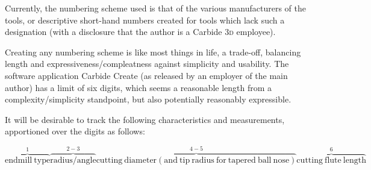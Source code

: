 \documentclass{ltxdoc}
\begin{document}
Currently, the numbering scheme used is that of the various manufacturers of the tools, or descriptive short-hand numbers created for tools which lack such a designation (with a disclosure that the author is a Carbide \textsc{3d} employee).

Creating any numbering scheme is like most things in life, a trade-off, balancing length and expressiveness/compleatness against simplicity and usability. The software application Carbide Create (as released by an employer of the main author) has a limit of six digits, which seems a reasonable length from a complexity/simplicity standpoint, but also potentially reasonably expressible.

It will be desirable to track the following characteristics and measurements, apportioned over the digits as follows:

\begin{equation*}
\overbrace{\mathrm{endmill\ type}}^1
\overbrace{\mathrm{radius/angle}}^{2-3}
\overbrace{\mathrm{cutting\ diameter (and\ tip\ radius\ for\ tapered\ ball\ nose)}}^{4-5}
\overbrace{\mathrm{cutting\ flute\ length}}^6
\end{equation*}
\end{document}

